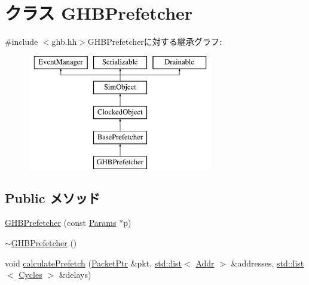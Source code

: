 \hypertarget{classGHBPrefetcher}{
\section{クラス GHBPrefetcher}
\label{classGHBPrefetcher}
}


{\ttfamily \#include $<$ghb.hh$>$}GHBPrefetcherに対する継承グラフ:\begin{figure}[H]
\begin{center}
\leavevmode
\includegraphics[height=5cm]{classGHBPrefetcher}
\end{center}
\end{figure}
\subsection*{Public メソッド}
\begin{DoxyCompactItemize}
\item 
\hyperlink{classGHBPrefetcher_aa168ac6ebc7ff59b10e32694370dd402}{GHBPrefetcher} (const \hyperlink{classBasePrefetcher_a46661f02a5642b04fd4e12f645ad9c5c}{Params} $\ast$p)
\item 
\hyperlink{classGHBPrefetcher_aaaf7b424b631ae41cc887bd13ef47451}{$\sim$GHBPrefetcher} ()
\item 
void \hyperlink{classGHBPrefetcher_a1cc3d838a8314074cfda794f18eb6de9}{calculatePrefetch} (\hyperlink{classPacket}{PacketPtr} \&pkt, \hyperlink{classstd_1_1list}{std::list}$<$ \hyperlink{base_2types_8hh_af1bb03d6a4ee096394a6749f0a169232}{Addr} $>$ \&addresses, \hyperlink{classstd_1_1list}{std::list}$<$ \hyperlink{classCycles}{Cycles} $>$ \&delays)
\end{DoxyCompactItemize}
